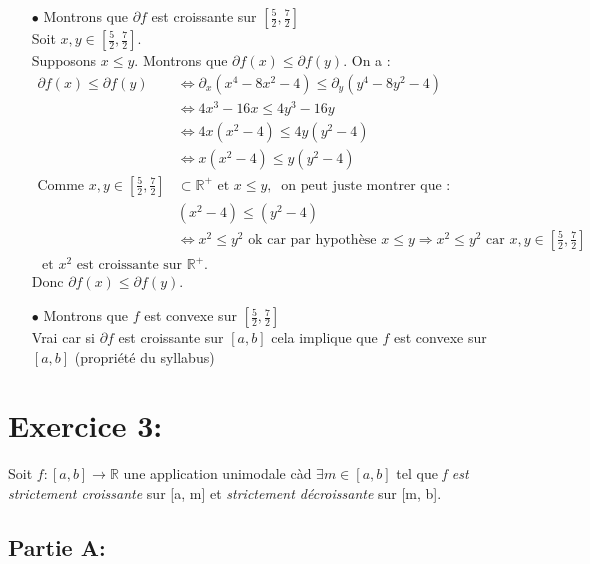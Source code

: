 \documentclass[a4paper, 12pt]{article}
\begin{document}
\begin{itemize}
	\item[$\bullet$] Montrons que $\partial f $ est croissante sur $[\frac{5}{2},\frac{7}{2}]$\\
		Soit $x,y \in [\frac{5}{2},\frac{7}{2}]$.\\
		Supposons $x \leqslant y$.
		Montrons que $\partial f(x) \leqslant \partial f(y)$.
		On a :
		\begin{align*}
		\partial f(x) \leqslant \partial f(y)& \Leftrightarrow \partial_x (x^4-8x^2-4) \leqslant \partial_y (y^4-8y^2-4)\\
		& \Leftrightarrow 4x^3-16x \leqslant 4y^3-16y\\
		& \Leftrightarrow 4x(x^2-4)\leqslant 4y(y^2-4)\\
		& \Leftrightarrow x(x^2-4) \leqslant y(y^2-4)\\
		\text{Comme }x,y\in \left[ \frac{5}{2},\frac{7}{2} \right] & \subset\mathbb{R}^+ \text{ et } x \leq y,~ \text{ on peut juste montrer que :} \\
		&(x^2-4) \leqslant (y^2-4)\\
		&\Leftrightarrow x^2\leqslant y^2 \text{ ok car par hypothèse } x\leqslant y \Rightarrow x^2 \leqslant y^2 \text{ car } x,y\in \left[\frac{5}{2},\frac{7}{2}\right] \\ \text{ et } x^2 \text{ est croissante sur  }\mathbb{R}^+.
		\end{align*}
	Donc $\partial f(x) \leqslant \partial f(y)$.
	\item[$\bullet$] Montrons que $f$ est convexe sur $[\frac{5}{2},\frac{7}{2}]$\\
	Vrai car si $\partial f$ est croissante sur $[a,b]$ cela implique que $f$ est convexe sur $[a,b]$ (propriété du syllabus)
\end{itemize}

\newpage

\section{Exercice 3:}

Soit \( f : [a, b] \rightarrow \mathbb{R} \) une application unimodale càd \( \exists m \in [a, b] \) tel que \emph{f est strictement croissante} sur [a, m] et \emph{strictement décroissante} sur [m, b].

\subsection{Partie A:}
\end{document}
